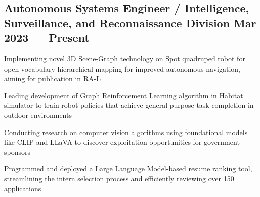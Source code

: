 \subsection{{Autonomous Systems Engineer / Intelligence, Surveillance, and Reconnaissance Division \hfill Mar 2023 --- Present}}
\begin{zitemize}
	\item Implementing novel 3D Scene-Graph technology on Spot quadruped robot for open-vocabulary hierarchical mapping for improved autonomous navigation, aiming for publication in RA-L
	\item Leading development of Graph Reinforcement Learning algorithm in Habitat simulator to train robot policies that achieve general purpose task completion in outdoor environments
	\item Conducting research on computer vision algorithms using foundational models like CLIP and LLaVA to discover exploitation opportunities for government sponsors
	\item Programmed and deployed a Large Language Model-based resume ranking tool, streamlining the intern selection process and efficiently reviewing over 150 applications

\end{zitemize}

